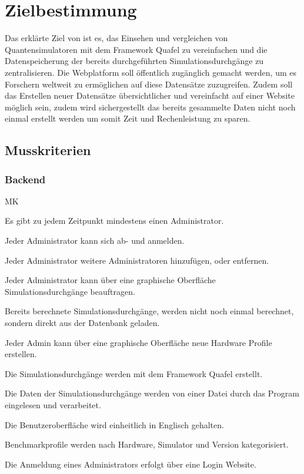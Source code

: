 \section{Zielbestimmung}
Das erklärte Ziel von \name ist es, das Einsehen und vergleichen von Quantensimulatoren mit dem Framework Quafel zu vereinfachen und die Datenspeicherung der bereits durchgeführten Simulationsdurchgänge zu zentralisieren. 
Die Webplatform soll öffentlich zugänglich gemacht werden, um es Forschern weltweit zu ermöglichen auf diese Datensätze zuzugreifen.
Zudem soll das Erstellen neuer Datensätze übersichtlicher und vereinfacht auf einer Website möglich sein, zudem wird sichergestellt das bereits gesammelte Daten nicht noch einmal erstellt werden um somit Zeit und Rechenleistung zu sparen.  



\subsection{Musskriterien}
\setcounter{counter}{10}
\subsubsection{Backend}
\begin{Kriterien}{MK}

    \item Es gibt zu jedem Zeitpunkt mindestens einen Administrator.

    \item Jeder Administrator kann sich ab- und anmelden. 
    
	\item Jeder Administrator weitere Administratoren hinzufügen, oder entfernen.

	\item Jeder Administrator kann über eine graphische Oberfläche Simulationsdurchgänge beauftragen.

    \item Bereits berechnete Simulationsdurchgänge, werden nicht noch einmal berechnet, sondern direkt aus der Datenbank geladen.

	\item Jeder Admin kann über eine graphische Oberfläche neue Hardware Profile erstellen.  

    \item Die Simulationsdurchgänge werden mit dem Framework Quafel erstellt.

    \item Die Daten der Simulationsdurchgänge werden von einer Datei durch das Program eingelesen und verarbeitet.

    \item Die Benutzeroberfläche wird einheitlich in Englisch gehalten.
 
	\item Benchmarkprofile werden nach Hardware, Simulator und Version kategorisiert.

    
	\item Die Anmeldung eines Administrators erfolgt über eine Login Website.
 
    
\end{Kriterien}
